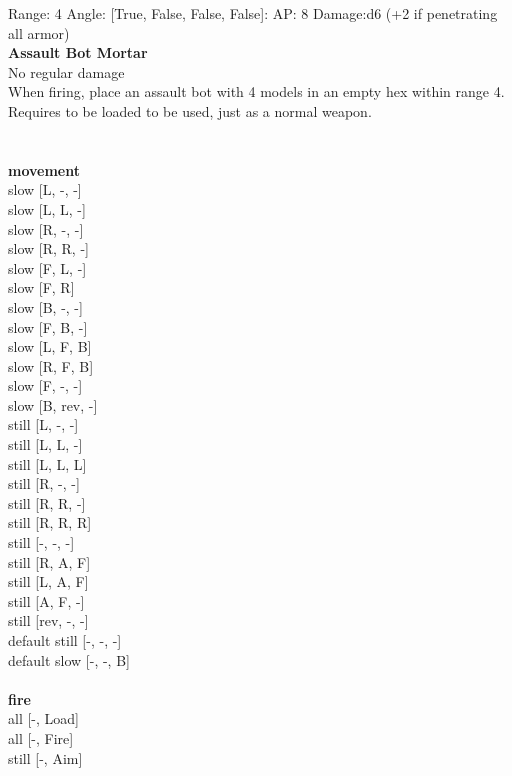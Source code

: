 Range: 4  Angle: [True, False, False, False]: AP: 8 Damage:d6 (+2 if penetrating all armor) \\




{\bf Assault Bot Mortar } \\

No regular damage\\ 
When firing, place an assault bot with 4 models in an empty hex within range 4. Requires to be loaded to be used, just as a normal weapon.\\ 





 
\ \\



\ \\ {\bf movement } \\
slow [L, -, -] \\
slow [L, L, -] \\
slow [R, -, -] \\
slow [R, R, -] \\
slow [F, L, -] \\
slow [F, R] \\
slow [B, -, -] \\
slow [F, B, -] \\
slow [L, F, B] \\
slow [R, F, B] \\
slow [F, -, -] \\
slow [B, rev, -] \\
still [L, -, -] \\
still [L, L, -] \\
still [L, L, L] \\
still [R, -, -] \\
still [R, R, -] \\
still [R, R, R] \\
still [-, -, -] \\
still [R, A, F] \\
still [L, A, F] \\
still [A, F, -] \\
still [rev, -, -] \\
default still [-, -, -] \\
default slow [-, -, B] \\
\ \\ {\bf fire } \\
all [-, Load] \\
all [-, Fire] \\
still [-, Aim] \\


